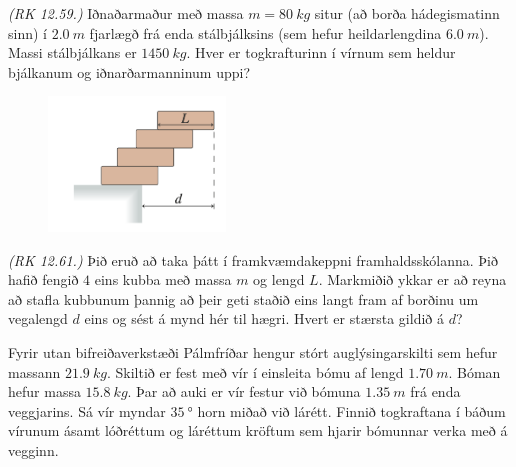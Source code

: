 \begin{enumerate}[label = \textbf{Dæmi \thechapter.\arabic*.}]
\begin{minipage}{\linewidth}
\item \textit{(RK 12.59.)} Iðnaðarmaður með massa $m = \SI{80}{kg}$ situr (að borða hádegismatinn sinn) í $\SI{2.0}{m}$ fjarlægð frá enda stálbjálksins (sem hefur heildarlengdina $\SI{6.0}{m}$). Massi stálbjálkans er $\SI{1450}{kg}$. Hver er togkrafturinn í vírnum sem heldur bjálkanum og iðnarðarmanninum uppi?
\end{minipage}

\vspace{0.5cm}

\begin{minipage}{\linewidth}

\begin{figure}
\vspace{0.5cm}
\includegraphics[width=1.85in]{images/restacks.png}
\end{figure}

\item \textit{(RK 12.61.)} Þið eruð að taka þátt í framkvæmdakeppni framhaldsskólanna. Þið hafið fengið $4$ eins kubba með massa $m$ og lengd $L$. Markmiðið ykkar er að reyna að stafla kubbunum þannig að þeir geti staðið eins langt fram af borðinu um vegalengd $d$ eins og sést á mynd hér til hægri. Hvert er stærsta gildið á $d$?

\vspace{0.5cm}


\item Fyrir utan bifreiðaverkstæði Pálmfríðar hengur stórt auglýsingarskilti sem hefur massann $\SI{21.9}{kg}$. Skiltið er fest með vír í einsleita bómu af lengd $\SI{1.70}{m}$. Bóman hefur massa $\SI{15.8}{kg}$. Þar að auki er vír festur við bómuna $\SI{1.35}{m}$ frá enda veggjarins. Sá vír myndar $\SI{35}{\degree}$ horn miðað við lárétt.  Finnið togkraftana í báðum vírunum ásamt lóðréttum og láréttum kröftum sem hjarir bómunnar verka með á vegginn.
\end{minipage}


\end{enumerate}
